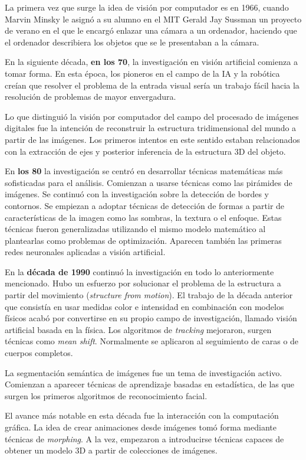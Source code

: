 La primera vez que surge la idea de visión por computador es en 1966, cuando Marvin Minsky le asignó a su alumno en el MIT Gerald Jay Sussman un proyecto de verano en el que le encargó enlazar una cámara a un ordenador, haciendo que el ordenador describiera los objetos que se le presentaban a la cámara.

En la siguiente década, \textbf{en los 70}, la investigación en visión artificial comienza a tomar forma. En esta época, los pioneros en el campo de la IA y la robótica creían que resolver el problema de la entrada visual sería un trabajo fácil hacia la resolución de problemas de mayor envergadura. 

Lo que distinguió la visión por computador del campo del procesado de imágenes digitales fue la intención de reconstruir la estructura tridimensional del mundo a partir de las imágenes. Los primeros intentos en este sentido estaban relacionados con la extracción de ejes y posterior inferencia de la estructura 3D del objeto.

En \textbf{los 80} la investigación se centró en desarrollar técnicas matemáticas más sofisticadas para el análisis. Comienzan a usarse técnicas como las pirámides de imágenes. Se continuó con la investigación sobre la detección de bordes y contornos. Se empiezan a adoptar técnicas de detección de formas a partir de características de la imagen como las sombras, la textura o el enfoque. Estas técnicas fueron generalizadas utilizando el mismo modelo matemático al plantearlas como problemas de optimización. Aparecen también las primeras redes neuronales aplicadas a visión artificial.

En la \textbf{década de 1990} continuó la investigación en todo lo anteriormente mencionado. Hubo un esfuerzo por solucionar el problema de la estructura a partir del movimiento (\textit{structure from motion}). El trabajo de la década anterior que consistía en usar medidas color e intensidad en combinación con modelos físicos acabó por convertirse en su propio campo de investigación, llamado visión artificial basada en la física. Los algoritmos de \textit{tracking} mejoraron, surgen técnicas como \textit{mean shift}. Normalmente se aplicaron al seguimiento de caras o de cuerpos completos.

La segmentación semántica de imágenes fue un tema de investigación activo. Comienzan a aparecer técnicas de aprendizaje basadas en estadística, de las que surgen los primeros algoritmos de reconocimiento facial.

El avance más notable en esta década fue la interacción con la computación gráfica. La idea de crear animaciones desde imágenes tomó forma mediante técnicas de \textit{morphing}. A la vez, empezaron a introducirse técnicas capaces de obtener un modelo 3D a partir de colecciones de imágenes.

